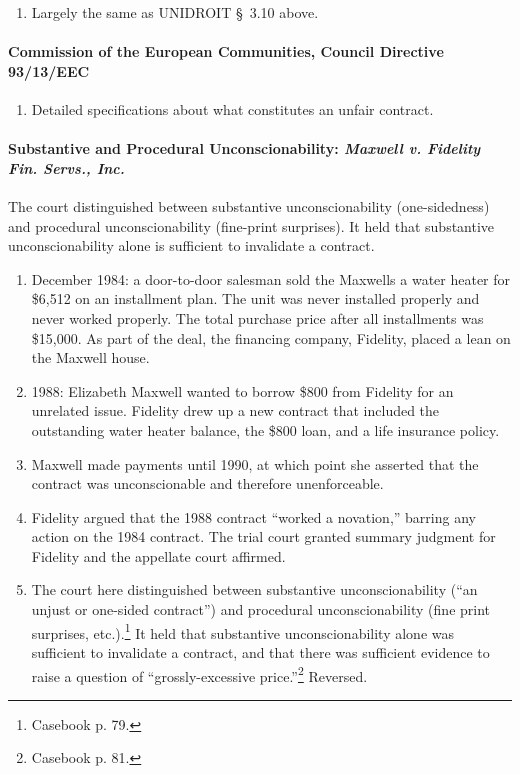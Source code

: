 \begin{enumerate}
    \item Largely the same as UNIDROIT \S\ 3.10 above.
\end{enumerate}

\paragraph{Commission of the European Communities, Council Directive 
93/13/EEC}

\begin{enumerate}
    \item Detailed specifications about what constitutes an unfair contract.
\end{enumerate}

\paragraph{Substantive and Procedural Unconscionability: \emph{Maxwell v. 
Fidelity Fin. Servs., Inc.}}

The court distinguished between substantive unconscionability (one-sidedness) 
and procedural unconscionability (fine-print surprises). It held that 
substantive unconscionability alone is sufficient to invalidate a contract.

\begin{enumerate}
    \item December 1984: a door-to-door salesman sold the Maxwells a water 
    heater for \$6,512 on an installment plan. The unit was never installed 
    properly and never worked properly. The total purchase price after all 
    installments was \$15,000. As part of the deal, the financing company, 
    Fidelity, placed a lean on the Maxwell house.
    \item 1988: Elizabeth Maxwell wanted to borrow \$800 from Fidelity for an 
    unrelated issue. Fidelity drew up a new contract that included the 
    outstanding water heater balance, the \$800 loan, and a life insurance 
    policy.
    \item Maxwell made payments until 1990, at which point she asserted that 
    the contract was unconscionable and therefore unenforceable.
    \item Fidelity argued that the 1988 contract ``worked a novation,'' 
    barring any action on the 1984 contract. The trial court granted summary 
    judgment for Fidelity and the appellate court affirmed.
    \item The court here distinguished between substantive unconscionability 
    (``an unjust or one-sided contract'') and procedural unconscionability 
    (fine print surprises, etc.).\footnote{Casebook p. 79.} It held that 
    substantive unconscionability alone was sufficient to invalidate a 
    contract, and that there was sufficient evidence to raise a question of 
    ``grossly-excessive price.''\footnote{Casebook p. 81.} Reversed.
\end{enumerate}

